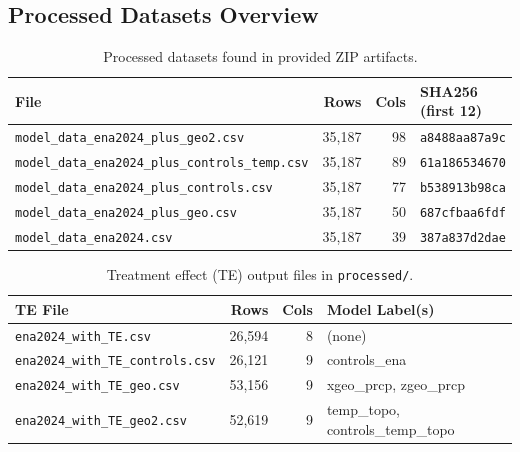 \documentclass[11pt,a4paper]{article}
\begin{document}
\subsection{Processed Datasets Overview}

\begin{table}[htbp]
\centering
\caption{Processed datasets found in provided ZIP artifacts.}
\label{tab:datasets}
\small
\begin{tabular}{L{5cm}rrl}
\toprule
\textbf{File} & \textbf{Rows} & \textbf{Cols} & \textbf{SHA256 (first 12)} \\
\midrule
\texttt{model\_data\_ena2024\_plus\_geo2.csv} & 35,187 & 98 & \texttt{a8488aa87a9c} \\
\texttt{model\_data\_ena2024\_plus\_controls\_temp.csv} & 35,187 & 89 & \texttt{61a186534670} \\
\texttt{model\_data\_ena2024\_plus\_controls.csv} & 35,187 & 77 & \texttt{b538913b98ca} \\
\texttt{model\_data\_ena2024\_plus\_geo.csv} & 35,187 & 50 & \texttt{687cfbaa6fdf} \\
\texttt{model\_data\_ena2024.csv} & 35,187 & 39 & \texttt{387a837d2dae} \\
\bottomrule
\end{tabular}
\end{table}

\begin{table}[htbp]
\centering
\caption{Treatment effect (TE) output files in \texttt{processed/}.}
\label{tab:teoutputs}
\small
\begin{tabular}{L{4.5cm}rrL{4cm}}
\toprule
\textbf{TE File} & \textbf{Rows} & \textbf{Cols} & \textbf{Model Label(s)} \\
\midrule
\texttt{ena2024\_with\_TE.csv} & 26,594 & 8 & (none) \\
\texttt{ena2024\_with\_TE\_controls.csv} & 26,121 & 9 & controls\_ena \\
\texttt{ena2024\_with\_TE\_geo.csv} & 53,156 & 9 & xgeo\_prcp, zgeo\_prcp \\
\texttt{ena2024\_with\_TE\_geo2.csv} & 52,619 & 9 & temp\_topo, controls\_temp\_topo \\
\bottomrule
\end{tabular}
\end{table}

\end{document}
